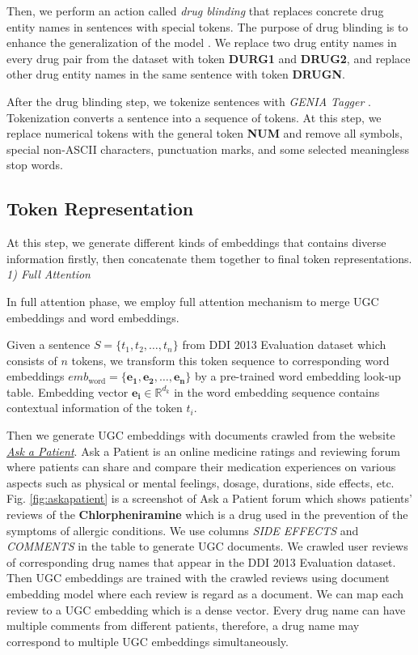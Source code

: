 \documentclass[conference]{IEEEtran}
\begin{document}
Then, we perform an action called \emph{drug blinding} that replaces concrete drug entity names in sentences with special tokens.
The purpose of drug blinding is to enhance the generalization of the model \cite{liu_drug-drug_2016}.
We replace two drug entity names in every drug pair from the dataset with token \textbf{DURG1} and \textbf{DRUG2},
and replace other drug entity names in the same sentence with token \textbf{DRUGN}.

After the drug blinding step, we tokenize sentences with \emph{GENIA Tagger} \cite{tsuruoka_genia_2006}.
Tokenization converts a sentence into a sequence of tokens.
At this step, we replace numerical tokens with the general token \textbf{NUM} and remove all symbols,
special non-ASCII characters, punctuation marks, and some selected meaningless stop words.

\subsection{Token Representation}

At this step, we generate different kinds of embeddings that contains diverse information firstly,
then concatenate them together to final token representations.\\

\emph{1) Full Attention}

\bigbreak

In full attention phase, we employ full attention mechanism to merge UGC embeddings and word embeddings.

Given a sentence $S = \{t_1, t_2, \dots, t_n\}$ from DDI 2013 Evaluation dataset
which consists of $n$ tokens, we transform this token sequence to corresponding word embeddings
$emb_{\text{word}} = \{ \bm{e_1}, \bm{e_2}, \dots, \bm{e_n} \}$ by a pre-trained word embedding look-up table.
Embedding vector $\bm{e_i} \in \mathbb{R}^{d_{k}}$ in the word embedding sequence contains contextual information of the token $t_i$.

Then we generate UGC embeddings with documents crawled from the website
\href{www.askapatient.com}{\emph{Ask a Patient}}.
Ask a Patient is an online medicine ratings and reviewing forum where patients can
share and compare their medication experiences on various aspects
such as physical or mental feelings, dosage, durations, side effects, etc.
Fig. \ref{fig:askapatient} is a screenshot of Ask a Patient forum which shows patients' reviews of the
\textbf{Chlorpheniramine} which is a drug used in the prevention of the symptoms of allergic conditions.
We use columns \emph{SIDE EFFECTS} and \emph{COMMENTS} in the table to generate UGC documents.
We crawled user reviews of corresponding drug names that appear in the DDI 2013 Evaluation dataset.
Then UGC embeddings are trained with the crawled reviews using document embedding model 
\cite{le_distributed_2014} where each review is regard as a document.
We can map each review to a UGC embedding which is a dense vector.
Every drug name can have multiple comments from different patients,
therefore, a drug name may correspond to multiple UGC embeddings simultaneously.
\end{document}

